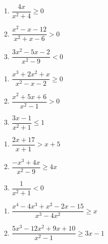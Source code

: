 \begin{multicols}{3}
\begin{enumerate}
\setcounter{enumi}{\value{HW}}


\item  $\dfrac{4x}{x^2+4} \geq 0$
\item  $\dfrac{x^2-x-12}{x^2+x-6} > 0$
\item  $\dfrac{3x^2-5x-2}{x^2-9} < 0$

\setcounter{HW}{\value{enumi}}
\end{enumerate}
\end{multicols}

\begin{multicols}{3}
\begin{enumerate}
\setcounter{enumi}{\value{HW}}


\item  $\dfrac{x^3+2x^2+x}{x^2-x-2} \geq 0$
\item $\dfrac{x^{2} + 5x + 6}{x^{2} - 1} > 0$
\item $\dfrac{3x - 1}{x^{2} + 1} \leq 1$

\setcounter{HW}{\value{enumi}}
\end{enumerate}
\end{multicols}

\begin{multicols}{3}
\begin{enumerate}
\setcounter{enumi}{\value{HW}}

\item $\dfrac{2x + 17}{x + 1} > x + 5$
\item $\dfrac{-x^{3} + 4x}{x^{2} - 9} \geq 4x$
\item $\dfrac{1}{x^{2} + 1} < 0$ 

\setcounter{HW}{\value{enumi}}
\end{enumerate}
\end{multicols}

\begin{multicols}{2}
\begin{enumerate}
\setcounter{enumi}{\value{HW}}

\item $\dfrac{x^4-4x^3+x^2-2x-15}{x^3-4x^2} \geq x$
\item $\dfrac{5x^3-12x^2+9x+10}{x^2-1}\geq 3x-1$ \label{ratlineqexerciselast}

\setcounter{HW}{\value{enumi}}
\end{enumerate}
\end{multicols}

